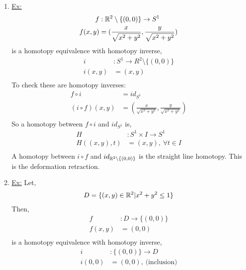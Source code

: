 \documentclass[../notes.tex]{subfiles}
\begin{document}
    \begin{enumerate}
        \item \underline{Ex:}
            \begin{align*}
                f&: \mathbb{R}^2\setminus\{(0,0)\}\rightarrow S^{1}\\
                f(x,y)&=(\frac{x}{\sqrt{x^2+y^2}},\frac{y}{\sqrt{x^2+y^2}})\\
            \end{align*}
            is a homotopy equivalence with homotopy inverse,
            \begin{align*}
                i&: S^{1}\rightarrow R^2\setminus\{(0,0)\}\\
                i(x,y)&=(x,y)\\
            \end{align*}
            To check these are homotopy inverses:
            \begin{align*}
                f\circ i &= id_{S^1}\\
                (i\circ f)(x,y)&=(\frac{x}{\sqrt{x^2+y^2}},\frac{y}{\sqrt{x^2+y^2}})\\
            \end{align*}
            So a homotopy between $f\circ i$ and $id_{S^{1}}$ is,
            \begin{align*}
                H&:S^{1}\times I\rightarrow S^{1}\\
                H((x,y),t)&=(x,y),\ \forall t\in I\\
            \end{align*}
            A homotopy between $i\circ f$ and $id_{\mathbb{R}^2\setminus\{(0,0)\}}$ is the straight line homotopy. This is
            the deformation retraction.
        \item \underline{Ex:} Let,
            \begin{align*}
                D&=\{(x,y)\in \mathbb{R}^2| x^2+y^2\leq 1\}\\
            \end{align*}
            Then,
            \begin{align*} 
                f&: D\rightarrow \{(0,0)\}\\
                f(x,y)&=(0,0)\\
            \end{align*}
            is a homotopy equivalence with homotopy inverse,
            \begin{align*}
                i&: \{(0,0)\}\rightarrow D\\
                i(0,0)&=(0,0),\ \text{(inclusion)}\\

\end{align*}
\end{enumerate}
\end{document}
